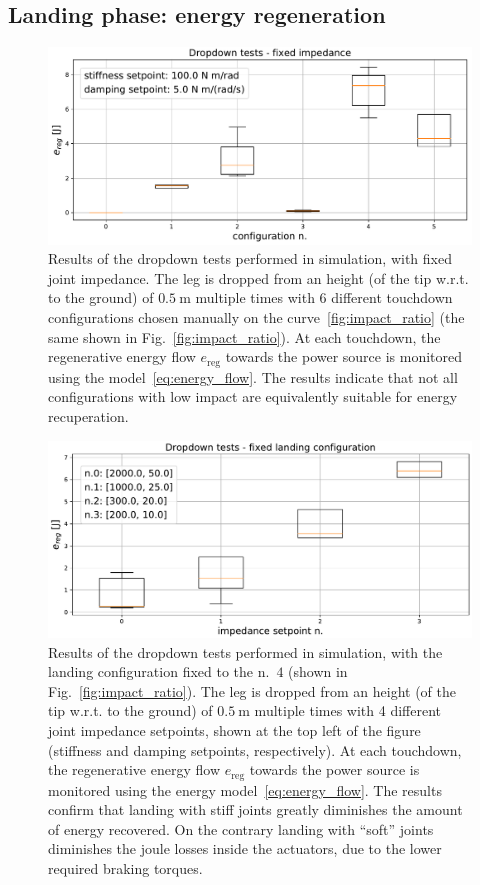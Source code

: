 \subsection{Landing phase: energy regeneration}\label{subsec:energy_reg}
\begin{figure}[t]
    \centering
    \includegraphics[width=1\columnwidth]{images/dropdown_const_imp.pdf}
    \caption{Results of the dropdown tests performed in simulation, with fixed joint impedance. The leg is dropped from an height (of the tip w.r.t. to the ground) of $0.5~\mathrm{m}$ multiple times with 6 different touchdown configurations chosen manually on the curve~\ref{fig:impact_ratio} (the same shown in Fig.~\ref{fig:impact_ratio}). At each touchdown, the regenerative energy flow $e_{\mathrm{reg}}$ towards the power source is monitored using the model~\eqref{eq:energy_flow}. The results indicate that not all configurations with low impact are equivalently suitable for energy recuperation.}
    \label{fig:fixed_imp_reg_energy}
\end{figure}
\begin{figure}[t]
    \centering
    \includegraphics[width=1\columnwidth]{images/dropdown_const_landing.pdf}
    \caption{Results of the dropdown tests performed in simulation, with the landing configuration fixed to the n.~$4$ (shown in Fig.~\ref{fig:impact_ratio}). The leg is dropped from an height (of the tip w.r.t. to the ground) of $0.5~\mathrm{m}$ multiple times with 4 different joint impedance setpoints, shown at the top left of the figure (stiffness and damping setpoints, respectively). At each touchdown, the regenerative energy flow $e_{\mathrm{reg}}$ towards the power source is monitored using the energy model~\eqref{eq:energy_flow}. The results confirm that landing with stiff joints greatly diminishes the amount of energy recovered. On the contrary landing with \enquote{soft} joints diminishes the joule losses inside the actuators, due to the lower required braking torques.}
    \label{fig:fixed_conf_reg_energy}
\end{figure}

